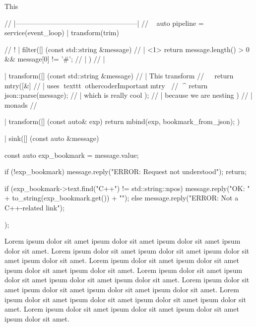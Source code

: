 \documentclass{article}
\begin{document}
This

\begin{othercoder}
//  |-----------------------------------------------------|
//  ~
    auto pipeline =
        service(event_loop)
            | transform(trim)

//  !
            | filter([] (const std::string &message) {            // | <1>
                return message.length() > 0 && message[0] != '#'; // |
            })                                                    // |

            | transform([] (const std::string &message) {  // | This transform
//            ^^^^^^^^^
                return mtry([&] {                          // | uses ▮texttt◀▮othercoderImportant◀mtry▶▶
//                     ^^^^
                    return json::parse(message);           // | which is really cool
                });                                        // | because we are nesting
            })                                             // | monads
//  ~

            | transform([] (const auto& exp) {
                return mbind(exp, bookmark_from_json);
            })

            | sink([] (const auto &message) {
                const auto exp_bookmark = message.value;

                if (!exp_bookmark) {
                    message.reply("ERROR: Request not understood\n");
                    return;
                }

                if (exp_bookmark->text.find("C++") != std::string::npos) {
                    message.reply("OK: " + to_string(exp_bookmark.get()) + "\n");
                } else {
                    message.reply("ERROR: Not a C++-related link\n");
                }
            });
\end{othercoder}

Lorem ipsum dolor sit amet ipsum dolor sit amet ipsum dolor sit amet ipsum dolor sit amet.
Lorem ipsum dolor sit amet ipsum dolor sit amet ipsum dolor sit amet ipsum dolor sit amet.
Lorem  ipsum dolor sit amet ipsum dolor sit amet ipsum dolor sit amet ipsum dolor sit amet.
Lorem ipsum dolor sit amet ipsum dolor sit amet ipsum dolor sit amet ipsum dolor sit amet.
Lorem ipsum dolor sit amet ipsum dolor sit amet ipsum dolor sit amet ipsum dolor sit amet.
Lorem ipsum dolor sit amet ipsum dolor sit amet ipsum dolor sit amet ipsum dolor sit amet.
Lorem ipsum dolor sit amet ipsum dolor sit amet ipsum dolor sit amet ipsum dolor sit amet.
\end{document}
